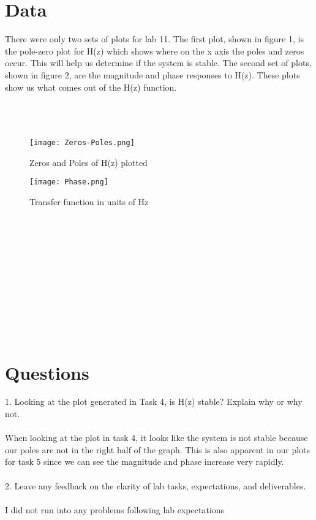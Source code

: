 \documentclass[12pt]{report}
\begin{document}
\section{Data}
\hspace{\parindent}There were only two sets of plots for lab 11. The first plot, shown in figure 1, is the pole-zero plot for H(z) which shows where on the x axis the poles and zeros occur. This will help us determine if the system is stable. The second set of plots, shown in figure 2, are the magnitude and phase responses to H(z). These plots show us what comes out of the H(z) function.\\\\\\\\
\begin{figure}[h!]
    \centering
    \texttt{[image: Zeros-Poles.png]}
    \caption{Zeros and Poles of H(z) plotted}
    \label{Figure x:}
\end{figure}
\begin{figure}[h!]
    \centering
    \texttt{[image: Phase.png]}
    \caption{Transfer function in units of Hz}
    \label{Figure x:}
\end{figure}
\\\\\\\\\\\\\\\\\\\\
\section{Questions}
1. Looking at the plot generated in Task 4, is H(z) stable? Explain why or why not.
\\\\
When looking at the plot in task 4, it looks like the system is not stable because our poles are not in the right half of the graph. This is also apparent in our plots for task 5 since we can see the magnitude and phase increase very rapidly.
\\\\
2. Leave any feedback on the clarity of lab tasks, expectations, and deliverables.
\\\\
I did not run into any problems following lab expectations
\end{document}

